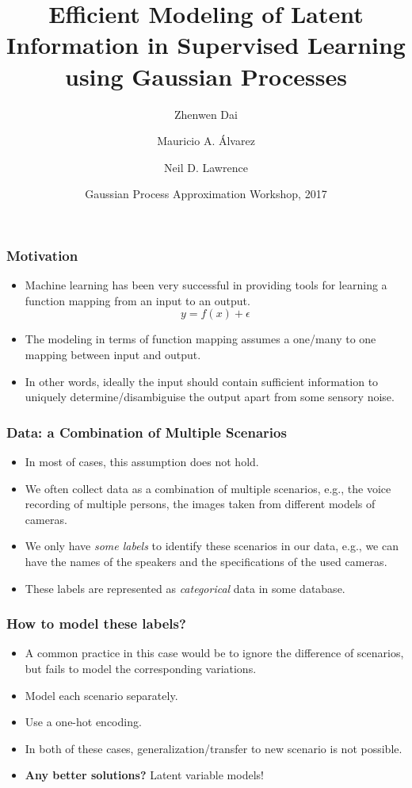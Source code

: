\documentclass[aspectratio=169]{beamer}
\begin{document}
\title[LVMOGP] %
{Efficient Modeling of Latent Information in Supervised Learning using Gaussian Processes}
\author[]{Zhenwen Dai \and Mauricio A. \'{A}lvarez \and Neil D. Lawrence}
\date[2017] %
{Gaussian Process Approximation Workshop, 2017}
\subject{Computer Science}

\frame{\titlepage}
  \begin{frame}
  \frametitle{Motivation}
  \begin{itemize}
  \item Machine learning has been very successful in providing tools for learning a function mapping from an input to an output.
  \begin{equation*}
  y = f(x) + \epsilon
  \end{equation*}
  \item The modeling in terms of function mapping assumes a one/many to one mapping between input and output. 
  \item In other words, ideally the input should contain sufficient information to uniquely determine/disambiguise the output apart from some sensory noise. 
  \end{itemize}
  \end{frame}

  \begin{frame}
  \frametitle{Data: a Combination of Multiple Scenarios}
  \begin{itemize}
  \item In most of cases, this assumption does not hold.
  \item We often collect data as a combination of multiple scenarios, e.g., the voice recording of multiple persons, the images taken from different models of cameras.
  \item We only have \emph{some labels} to identify these scenarios in our data, e.g., we can have the names of the speakers and the specifications of the used cameras. 
  \item These labels are represented as \emph{categorical} data in some database.
  \end{itemize}
  \end{frame}
  
    \begin{frame}
  \frametitle{How to model these labels?}
  \begin{itemize}
  \item A common practice in this case would be to ignore the difference of scenarios, but fails to model the corresponding variations.
  \item Model each scenario separately. 
  \item Use a one-hot encoding.
  \item In both of these cases, generalization/transfer to new scenario is not possible.
  \item \textbf{Any better solutions?} Latent variable models!
  \end{itemize}
  \end{frame}
\end{document}
